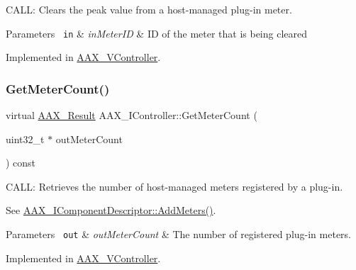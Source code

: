 C\+A\+LL\+: Clears the peak value from a host-\/managed plug-\/in meter. 


\begin{DoxyParams}[1]{Parameters}
\mbox{\texttt{ in}}  & {\em in\+Meter\+ID} & ID of the meter that is being cleared \\
\hline
\end{DoxyParams}


Implemented in \mbox{\hyperlink{a01905_a831e8acd4da78cccfd821892c82c9b96}{A\+A\+X\+\_\+\+V\+Controller}}.

\mbox{\label{a01789_a3ad8e35bb6b51be934696c39a45157e7}} 
\subsubsection{\texorpdfstring{GetMeterCount()}{GetMeterCount()}}
{\footnotesize\ttfamily virtual \mbox{\hyperlink{a00392_a4d8f69a697df7f70c3a8e9b8ee130d2f}{A\+A\+X\+\_\+\+Result}} A\+A\+X\+\_\+\+I\+Controller\+::\+Get\+Meter\+Count (\begin{DoxyParamCaption}\item[{uint32\+\_\+t $\ast$}]{out\+Meter\+Count }\end{DoxyParamCaption}) const\hspace{0.3cm}{\ttfamily [pure virtual]}}



C\+A\+LL\+: Retrieves the number of host-\/managed meters registered by a plug-\/in. 

See \mbox{\hyperlink{a01781_a5e4a61afa3d6510891e16d7179bdaa64}{A\+A\+X\+\_\+\+I\+Component\+Descriptor\+::\+Add\+Meters()}}.


\begin{DoxyParams}[1]{Parameters}
\mbox{\texttt{ out}}  & {\em out\+Meter\+Count} & The number of registered plug-\/in meters. \\
\hline
\end{DoxyParams}


Implemented in \mbox{\hyperlink{a01905_ac80621fb72de960d43f425d388928c3f}{A\+A\+X\+\_\+\+V\+Controller}}.

\mbox{\label{a01789_a1f07fa44cd8b3c4fddee9c0b78d35bbd}} 
